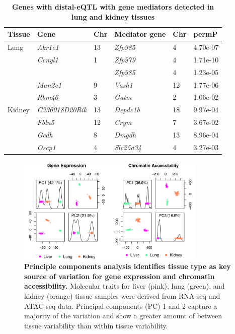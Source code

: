 \documentclass[9pt,twocolumn,twoside]{gsajnl}
\begin{document}
\begin{table}[h]
\renewcommand{\familydefault}{\sfdefault}\normalfont
\begin{tableminipage}{\textwidth}
\captionsetup{width=\textwidth}
\centering
\caption{\bf Genes with distal-eQTL with gene mediators detected in lung and kidney tissues
\label{tab:exmediation}}
\end{tableminipage}
\begin{tableminipage}{\textwidth}
\begin{tabularx}{\textwidth}{lll|XXX}
\hline 
Tissue & Gene & Chr & Mediator gene & Chr & permP \\
\hline
Lung & \textit{Akr1e1} & 13 & \textit{Zfp985} & 4 & 4.70e-07 \\
& \textit{Ccnyl1} & 1 & \textit{Zfp979} & 4 & 1.71e-10 \\
& & & \textit{Zfp985} & 4 & 1.23e-05 \\ 
& \textit{Man2c1} & 9 & \textit{Vash1} & 12 & 1.77e-06 \\
& \textit{Rbm46} & 3 & \textit{Gatm} & 2 & 1.06e-02 \\
\hline
Kidney & \textit{C330018D20Rik} & 13 & \textit{Depdc1b} & 18 & 9.97e-04 \\
& \textit{Fbln5} & 12 & \textit{Crym} & 7 & 3.67e-02 \\
& \textit{Gcdh} & 8 & \textit{Dmgdh} & 13 & 8.96e-04 \\
& \textit{Oscp1} & 4 & \textit{Slc25a34} & 4 & 3.27e-03 \\
\hline
\end{tabularx}
\end{tableminipage}
\end{table}

\clearpage

\begin{figure}[hp]
\renewcommand{\familydefault}{\sfdefault}\normalfont
\centering
\includegraphics[width=0.8\textwidth, trim={0in 0in 0in 0in}, clip]{figs/pca_plot.pdf}
\caption{\textbf{Principle components analysis identifies tissue type as key source of variation for gene expression and chromatin accessibility.} Molecular traits for liver (pink), lung (green), and kidney (orange) tissue samples were derived from RNA-seq and ATAC-seq data. Principal components (PC) 1 and 2 capture a majority of the variation and show a greater amount of between tissue variability than within tissue variability. \label{fig:pca_plots}}
\end{figure}
\end{document}
